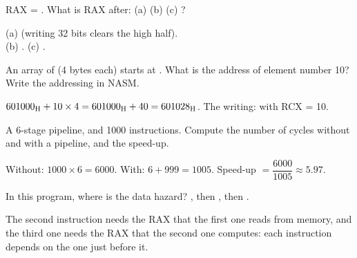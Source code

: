 \begin{tamrin}
    RAX = . What is RAX after: (a)  (b)  (c) ?
\end{tamrin}
\begin{hall}
    (a)  (writing 32 bits clears the high half).\\
    (b) . \quad (c) .
\end{hall}

\begin{tamrin}
    An array of  (4 bytes each) starts at . What is the address of element number 10? Write the addressing in NASM.
\end{tamrin}
\begin{hall}
    $\mbox{601000\textsubscript{H}} + 10 \times 4 = \mbox{601000\textsubscript{H}} + 40 = \mbox{601028\textsubscript{H}}$. The writing:  with RCX = 10.
\end{hall}

\begin{tamrin}
    A 6-stage pipeline, and 1000 instructions. Compute the number of cycles without and with a pipeline, and the speed-up.
\end{tamrin}
\begin{hall}
    Without: $1000 \times 6 = 6000$. With: $6 + 999 = 1005$. Speed-up $= \dfrac{6000}{1005} \approx 5.97$.
\end{hall}

\begin{tamrin}
    In this program, where is the data hazard? , then , then .
\end{tamrin}
\begin{hall}
    The second instruction needs the RAX that the first one reads from memory, and the third one needs the RAX that the
    second one computes: each instruction depends on the one just before it.
\end{hall}
